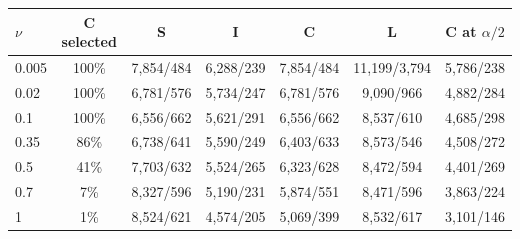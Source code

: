 \begin{tabular}{@{}lcccccc@{}}
\toprule
 $\nu$ & C selected & S & I & C & L & C at $\alpha/2$\\
\midrule
0.005 & 100\% & 7,854/484 & 6,288/239 & 7,854/484 & 11,199/3,794 & 5,786/238\\
0.02 & 100\% & 6,781/576 & 5,734/247 & 6,781/576 & 9,090/966 & 4,882/284\\
0.1 & 100\% & 6,556/662 & 5,621/291 & 6,556/662 & 8,537/610 & 4,685/298\\
0.35 & 86\% & 6,738/641 & 5,590/249 & 6,403/633 & 8,573/546 & 4,508/272\\
0.5 & 41\% & 7,703/632 & 5,524/265 & 6,323/628 & 8,472/594 & 4,401/269\\
0.7 & 7\% & 8,327/596 & 5,190/231 & 5,874/551 & 8,471/596 & 3,863/224\\
1 & 1\% & 8,524/621 & 4,574/205 & 5,069/399 & 8,532/617 & 3,101/146\\
\bottomrule
\end{tabular}
